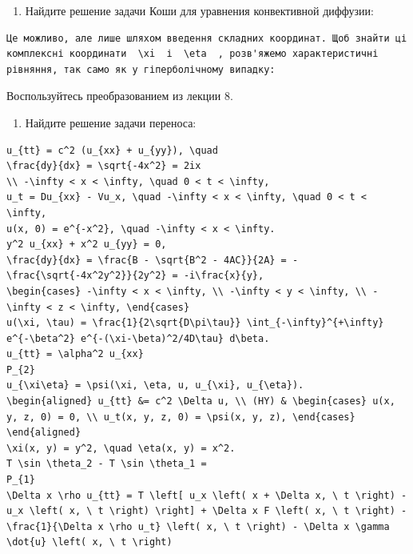 \documentclass[
  ukrainian,
]{article}
\providecommand{\tightlist}{%
  \setlength{\itemsep}{0pt}\setlength{\parskip}{0pt}}
\begin{document}
\begin{enumerate}
\def\labelenumi{\arabic{enumi}.}
\setcounter{enumi}{1}
\tightlist
\item
  Найдите решение задачи Коши для уравнения конвективной диффузии:
\end{enumerate}

\begin{verbatim}
Це можливо, але лише шляхом введення складних координат. Щоб знайти ці комплексні координати  \xi  і  \eta  , розв'яжемо характеристичні рівняння, так само як у гіперболічному випадку:
\end{verbatim}

Воспользуйтесь преобразованием из лекции 8.

\begin{enumerate}
\def\labelenumi{\arabic{enumi}.}
\setcounter{enumi}{2}
\tightlist
\item
  Найдите решение задачи переноса:
\end{enumerate}

\begin{verbatim}
u_{tt} = c^2 (u_{xx} + u_{yy}), \quad
\frac{dy}{dx} = \sqrt{-4x^2} = 2ix
\\ -\infty < x < \infty, \quad 0 < t < \infty,
u_t = Du_{xx} - Vu_x, \quad -\infty < x < \infty, \quad 0 < t < \infty,
u(x, 0) = e^{-x^2}, \quad -\infty < x < \infty.
y^2 u_{xx} + x^2 u_{yy} = 0,
\frac{dy}{dx} = \frac{B - \sqrt{B^2 - 4AC}}{2A} = -\frac{\sqrt{-4x^2y^2}}{2y^2} = -i\frac{x}{y},
\begin{cases} -\infty < x < \infty, \\ -\infty < y < \infty, \\ -\infty < z < \infty, \end{cases}
u(\xi, \tau) = \frac{1}{2\sqrt{D\pi\tau}} \int_{-\infty}^{+\infty} e^{-\beta^2} e^{-(\xi-\beta)^2/4D\tau} d\beta.
u_{tt} = \alpha^2 u_{xx}
P_{2}
u_{\xi\eta} = \psi(\xi, \eta, u, u_{\xi}, u_{\eta}).
\begin{aligned} u_{tt} &= c^2 \Delta u, \\ (HY) & \begin{cases} u(x, y, z, 0) = 0, \\ u_t(x, y, z, 0) = \psi(x, y, z), \end{cases} \end{aligned}
\xi(x, y) = y^2, \quad \eta(x, y) = x^2.
T \sin \theta_2 - T \sin \theta_1 =
P_{1}
\Delta x \rho u_{tt} = T \left[ u_x \left( x + \Delta x, \ t \right) - u_x \left( x, \ t \right) \right] + \Delta x F \left( x, \ t \right) - \frac{1}{\Delta x \rho u_t} \left( x, \ t \right) - \Delta x \gamma \dot{u} \left( x, \ t \right)
\end{verbatim}
\end{document}

